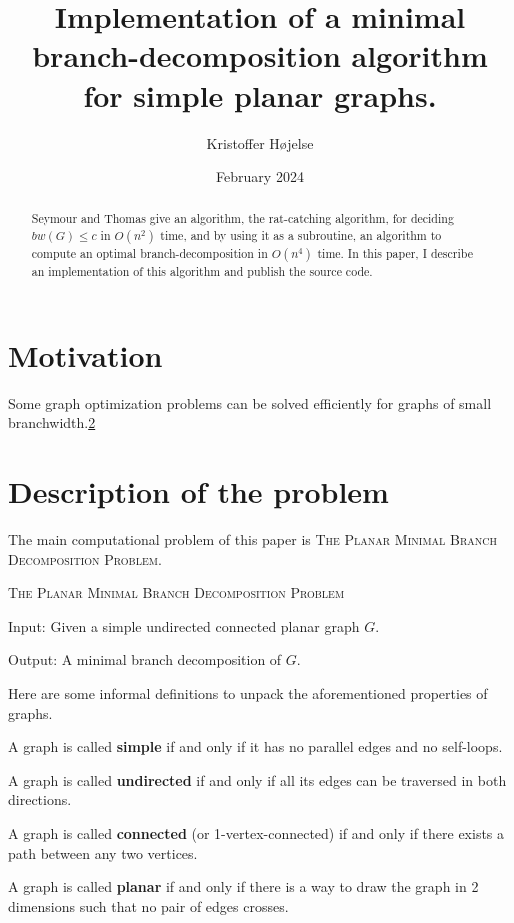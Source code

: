 \documentclass{article}
\title{Implementation of a minimal branch-decomposition algorithm for simple planar graphs.}
\author{Kristoffer Højelse}
\date{February 2024}
\begin{document}
\maketitle

\begin{abstract}
	Seymour and Thomas give an algorithm, the rat-catching algorithm, for deciding $bw(G) \leq c$ in $O(n^2)$ time, and by using it as a subroutine, an algorithm to compute an optimal branch-decomposition in $O(n^4)$ time. In this paper, I describe an implementation of this algorithm and publish the source code.
\end{abstract}

\section{Motivation}
	Some graph optimization problems can be solved efficiently for graphs of small branchwidth.\ref{}


\section{Description of the problem}

	The main computational problem of this paper is \textsc{The Planar Minimal Branch Decomposition Problem}.

	\begin{definition}
		\textsc{The Planar Minimal Branch Decomposition Problem}

		Input: Given a simple undirected connected planar graph $G$.

		Output: A minimal branch decomposition of $G$.
	\end{definition}

	Here are some informal definitions to unpack the aforementioned properties of graphs.

	A graph is called \textbf{simple} if and only if it has no parallel edges and no self-loops.

	A graph is called \textbf{undirected} if and only if all its edges can be traversed in both directions.

	A graph is called \textbf{connected} (or 1-vertex-connected) if and only if there exists a path between any two vertices.

	A graph is called \textbf{planar} if and only if there is a way to draw the graph in 2 dimensions such that no pair of edges crosses.
\end{document}
